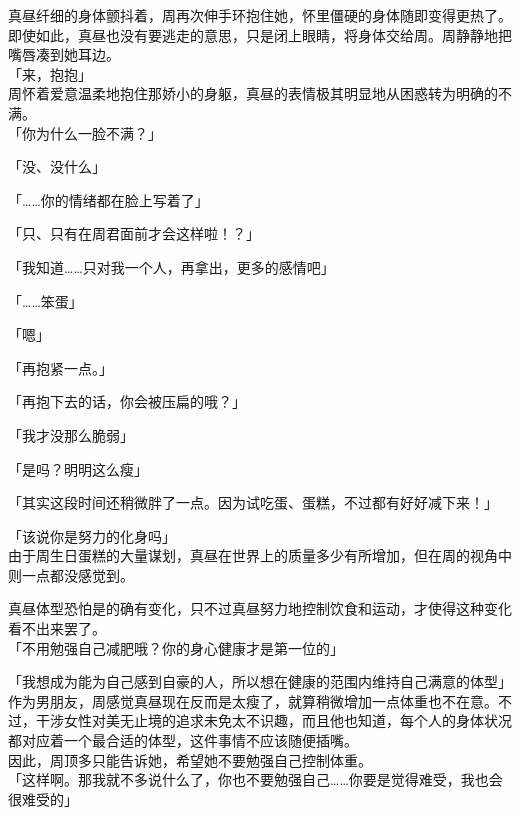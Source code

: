 真昼纤细的身体颤抖着，周再次伸手环抱住她，怀里僵硬的身体随即变得更热了。\\

即使如此，真昼也没有要逃走的意思，只是闭上眼睛，将身体交给周。周静静地把嘴唇凑到她耳边。\\

「来，抱抱」\\

周怀着爱意温柔地抱住那娇小的身躯，真昼的表情极其明显地从困惑转为明确的不满。\\

「你为什么一脸不满？」

「没、没什么」

「……你的情绪都在脸上写着了」

「只、只有在周君面前才会这样啦！？」

「我知道……只对我一个人，再拿出，更多的感情吧」

「……笨蛋」

「嗯」

「再抱紧一点。」

「再抱下去的话，你会被压扁的哦？」

「我才没那么脆弱」

「是吗？明明这么瘦」

「其实这段时间还稍微胖了一点。因为试吃蛋、蛋糕，不过都有好好减下来！」

「该说你是努力的化身吗」\\

由于周生日蛋糕的大量谋划，真昼在世界上的质量多少有所增加，但在周的视角中则一点都没感觉到。

真昼体型恐怕是的确有变化，只不过真昼努力地控制饮食和运动，才使得这种变化看不出来罢了。\\

「不用勉强自己减肥哦？你的身心健康才是第一位的」

「我想成为能为自己感到自豪的人，所以想在健康的范围内维持自己满意的体型」\\

作为男朋友，周感觉真昼现在反而是太瘦了，就算稍微增加一点体重也不在意。不过，干涉女性对美无止境的追求未免太不识趣，而且他也知道，每个人的身体状况都对应着一个最合适的体型，这件事情不应该随便插嘴。\\

因此，周顶多只能告诉她，希望她不要勉强自己控制体重。\\

「这样啊。那我就不多说什么了，你也不要勉强自己……你要是觉得难受，我也会很难受的」

